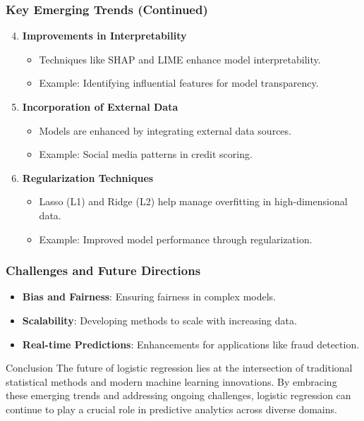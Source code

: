 \documentclass[aspectratio=169]{beamer}
\begin{document}
\begin{frame}[fragile]
  \frametitle{Key Emerging Trends (Continued)}

  \begin{enumerate}
    \setcounter{enumi}{3}
    \item \textbf{Improvements in Interpretability}
      \begin{itemize}
        \item Techniques like SHAP and LIME enhance model interpretability.
        \item Example: Identifying influential features for model transparency.
      \end{itemize}
      
    \item \textbf{Incorporation of External Data}
      \begin{itemize}
        \item Models are enhanced by integrating external data sources.
        \item Example: Social media patterns in credit scoring.
      \end{itemize}
      
    \item \textbf{Regularization Techniques}
      \begin{itemize}
        \item Lasso (L1) and Ridge (L2) help manage overfitting in high-dimensional data.
        \item Example: Improved model performance through regularization.
      \end{itemize}
  \end{enumerate}

\end{frame}

\begin{frame}[fragile]
  \frametitle{Challenges and Future Directions}

  \begin{itemize}
    \item \textbf{Bias and Fairness}: Ensuring fairness in complex models.
    \item \textbf{Scalability}: Developing methods to scale with increasing data.
    \item \textbf{Real-time Predictions}: Enhancements for applications like fraud detection.
  \end{itemize}
  
  \begin{block}{Conclusion}
    The future of logistic regression lies at the intersection of traditional statistical methods and modern machine learning innovations. By embracing these emerging trends and addressing ongoing challenges, logistic regression can continue to play a crucial role in predictive analytics across diverse domains.
  \end{block}
  
\end{frame}
\end{document}
